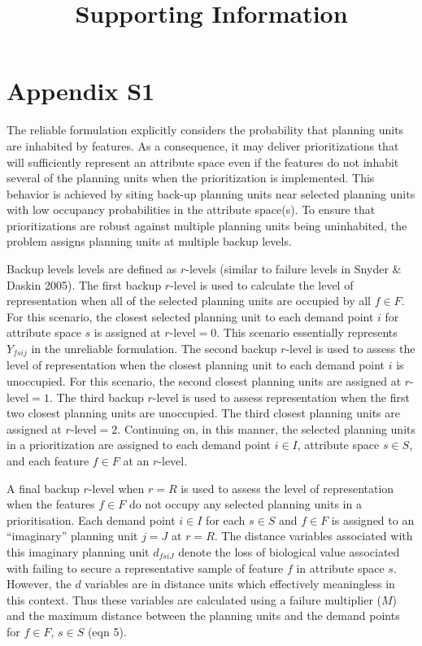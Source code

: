 \documentclass[11pt,]{article}
\title{Supporting Information}
\author{}
\date{}
\begin{document}
\maketitle

\setcounter{figure}{0} \setcounter{table}{0}
\renewcommand{\thefigure}{S\arabic{figure}}
\renewcommand{\thetable}{S\arabic{table}}

\section{Appendix S1}\label{appendix-s1}

The reliable formulation explicitly considers the probability that
planning units are inhabited by features. As a consequence, it may
deliver prioritizations that will sufficiently represent an attribute
space even if the features do not inhabit several of the planning units
when the prioritization is implemented. This behavior is achieved by
siting back-up planning units near selected planning units with low
occupancy probabilities in the attribute space(s). To ensure that
prioritizations are robust against multiple planning units being
uninhabited, the problem assigns planning units at multiple backup
levels.

Backup levels levels are defined as \(r\)-levels (similar to failure
levels in Snyder \& Daskin 2005). The first backup \(r\)-level is used
to calculate the level of representation when all of the selected
planning units are occupied by all \(f \in F\). For this scenario, the
closest selected planning unit to each demand point \(i\) for attribute
space \(s\) is assigned at \(r\)-level\(=0\). This scenario essentially
represents \(Y_{fsij}\) in the unreliable formulation. The second backup
\(r\)-level is used to assess the level of representation when the
closest planning unit to each demand point \(i\) is unoccupied. For this
scenario, the second closest planning units are assigned at
\(r\)-level\(=1\). The third backup \(r\)-level is used to assess
representation when the first two closest planning units are unoccupied.
The third closest planning units are assigned at \(r\)-level\(=2\).
Continuing on, in this manner, the selected planning units in a
prioritization are assigned to each demand point \(i \in I\), attribute
space \(s \in S\), and each feature \(f \in F\) at an \(r\)-level.

A final backup \(r\)-level when \(r=R\) is used to assess the level of
representation when the features \(f \in F\) do not occupy any selected
planning units in a prioritisation. Each demand point \(i \in I\) for
each \(s \in S\) and \(f \in F\) is assigned to an ``imaginary''
planning unit \(j=J\) at \(r=R\). The distance variables associated with
this imaginary planning unit \(d_{fsiJ}\) denote the loss of biological
value associated with failing to secure a representative sample of
feature \(f\) in attribute space \(s\). However, the \(d\) variables are
in distance units which effectively meaningless in this context. Thus
these variables are calculated using a failure multiplier (\(M\)) and
the maximum distance between the planning units and the demand points
for \(f \in F\), \(s \in S\) (eqn 5).
\end{document}

